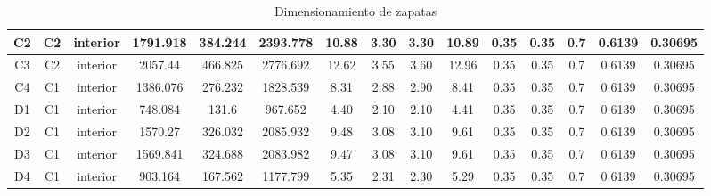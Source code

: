 \begin{table}[H]
{\begin{tabular}{|c|c|c|c|c|c|c|c|c|c|c|c|c|c|c|}
\hline
C2  & \cellcolor[rgb]{ .973,  .796,  .678}C2 & interior & 1791.918 & 384.244 & 2393.778 & 10.88 & 3.30 & 3.30 & 10.89 & 0.35 & 0.35 & 0.7 & 0.6139 & 0.30695 \bigstrut\\
\hline
C3  & \cellcolor[rgb]{ .973,  .796,  .678}C2 & interior & 2057.44 & 466.825 & 2776.692 & 12.62 & 3.55 & 3.60 & 12.96 & 0.35 & 0.35 & 0.7 & 0.6139 & 0.30695 \bigstrut\\
\hline
C4  & \cellcolor[rgb]{ .741,  .843,  .933}C1 & interior & 1386.076 & 276.232 & 1828.539 & 8.31 & 2.88 & 2.90 & 8.41 & 0.35 & 0.35 & 0.7 & 0.6139 & 0.30695 \bigstrut\\
\hline
D1  & \cellcolor[rgb]{ .741,  .843,  .933}C1 & interior & 748.084 & 131.6 & 967.652 & 4.40 & 2.10 & 2.10 & 4.41 & 0.35 & 0.35 & 0.7 & 0.6139 & 0.30695 \bigstrut\\
\hline
D2  & \cellcolor[rgb]{ .741,  .843,  .933}C1 & interior & 1570.27 & 326.032 & 2085.932 & 9.48 & 3.08 & 3.10 & 9.61 & 0.35 & 0.35 & 0.7 & 0.6139 & 0.30695 \bigstrut\\
\hline
D3  & \cellcolor[rgb]{ .741,  .843,  .933}C1 & interior & 1569.841 & 324.688 & 2083.982 & 9.47 & 3.08 & 3.10 & 9.61 & 0.35 & 0.35 & 0.7 & 0.6139 & 0.30695 \bigstrut\\
\hline
D4  & \cellcolor[rgb]{ .741,  .843,  .933}C1 & interior & 903.164 & 167.562 & 1177.799 & 5.35 & 2.31 & 2.30 & 5.29 & 0.35 & 0.35 & 0.7 & 0.6139 & 0.30695
\bigstrut[t]\\
\end{tabular}}%

    \caption{Dimensionamiento de zapatas}
    \label{tab:dimensionamiento}
\end{table}